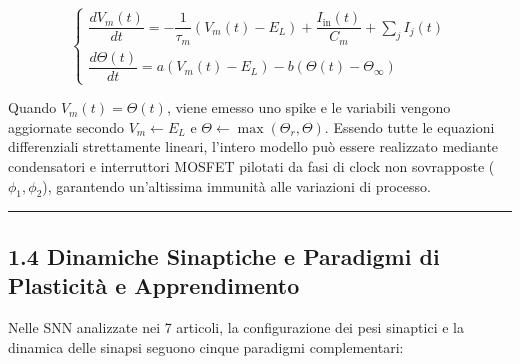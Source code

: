 \documentclass[11pt,a4paper]{article}
\begin{document}
\[
\begin{cases}
\dfrac{dV_m(t)}{dt} = -\dfrac{1}{\tau_m}\left(V_m(t) - E_L\right) + \dfrac{I_{\text{in}}(t)}{C_m} + \sum_j I_j(t) \\
\dfrac{d\Theta(t)}{dt} = a\left(V_m(t) - E_L\right) - b\left(\Theta(t) - \Theta_\infty\right)
\end{cases}
\]

Quando $V_m(t) = \Theta(t)$, viene emesso uno spike e le variabili vengono aggiornate secondo $V_m \leftarrow E_L$ e $\Theta \leftarrow \max(\Theta_r, \Theta)$. Essendo tutte le equazioni differenziali strettamente lineari, l'intero modello può essere realizzato mediante condensatori e interruttori MOSFET pilotati da fasi di clock non sovrapposte ($\phi_1, \phi_2$), garantendo un'altissima immunità alle variazioni di processo.

\bigskip\hrule\bigskip

\subsection{1.4 Dinamiche Sinaptiche e Paradigmi di Plasticità e Apprendimento}

Nelle SNN analizzate nei 7 articoli, la configurazione dei pesi sinaptici e la dinamica delle sinapsi seguono cinque paradigmi complementari:
\end{document}
